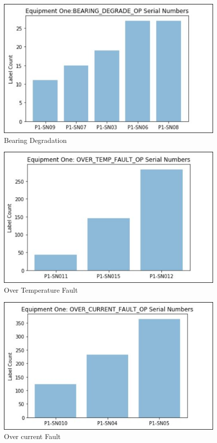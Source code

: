 \documentclass[sigconf]{acmart}
\begin{document}
\begin{figure}
\includegraphics[width=1.0\columnwidth]{images/DEGRADE}
\caption{Bearing Degradation} \label{fig:Figure5}
\end{figure}

\begin{figure}
\includegraphics[width=1.0\columnwidth]{images/OVERTEMP}
\caption{Over Temperature Fault} \label{fig:Figure6}
\end{figure}

\begin{figure}
\includegraphics[width=1.0\columnwidth]{images/OVERCURR}
\caption{Over current Fault} \label{fig:Figure7}
\end{figure}
\end{document}
